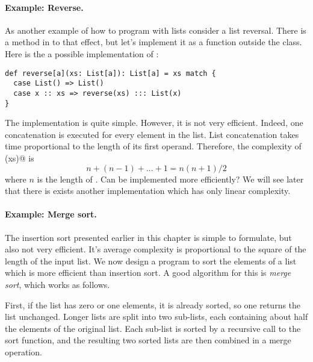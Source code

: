 \documentclass[11pt]{book}
\begin{document}
\paragraph{Example: Reverse.} As another example of how to program with
lists consider a list reversal. There is a method \verb@reverse@ in
\verb@List@ to that effect, but let's implement it as a function
outside the class. Here is the a possible implementation of
\verb@reverse@:
\begin{verbatim}
def reverse[a](xs: List[a]): List[a] = xs match {
  case List() => List()
  case x :: xs => reverse(xs) ::: List(x)
}
\end{verbatim}
The implementation is quite simple. However, it is not very efficient.
Indeed, one concatenation is executed for every element in the
list. List concatenation takes time proportional to the length
of its first operand. Therefore, the complexity of \verb@reverse(xs)@ is 
\[
n + (n - 1) + ... + 1 = n(n+1)/2
\]
where $n$ is the length of \verb@xs@. Can \verb@reverse@ be
implemented more efficiently? We will see later that there is exists
another implementation which has only linear complexity.

\paragraph{Example: Merge sort.}
The insertion sort presented earlier in this chapter is simple to
formulate, but also not very efficient. It's average complexity is
proportional to the square of the length of the input list. We now
design a program to sort the elements of a list which is more
efficient than insertion sort. A good algorithm for this is {\em merge
sort}, which works as follows.

First, if the list has zero or one elements, it is already sorted, so
one returns the list unchanged. Longer lists are split into two
sub-lists, each containing about half the elements of the original
list. Each sub-list is sorted by a recursive call to the sort
function, and the resulting two sorted lists are then combined in a
merge operation.
\end{document}
